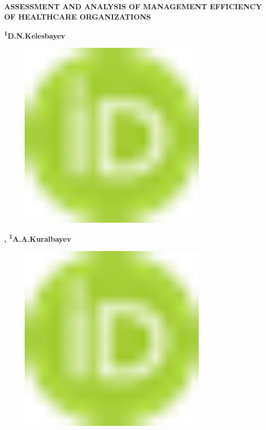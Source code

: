 
{\bfseries ASSESSMENT AND ANALYSIS OF MANAGEMENT EFFICIENCY OF HEALTHCARE
ORGANIZATIONS}

{\bfseries \textsuperscript{1}D.N.Kelesbayev}
\begin{figure}[H]
	\centering
	\includegraphics[width=0.8\textwidth]{media/ekon2/image1}
	\caption*{}
\end{figure}
{\bfseries \textsuperscript{\envelope },
\textsuperscript{1}A.A.Kuralbayev}
\begin{figure}[H]
	\centering
	\includegraphics[width=0.8\textwidth]{media/ekon2/image1}
	\caption*{}
\end{figure}
